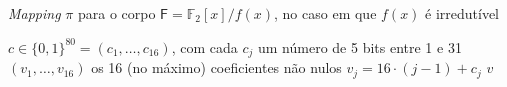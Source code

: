 \begin{algorithm}[htb!]
\caption{\textit{Mapping} $\pi$ para o corpo $\mathsf{F} = \mathbb{F}_2[x]/f(x)$, no caso em que $f(x)$ é irredutível}\label{alg:pi_irreduc}
  \begin{algorithmic}
    \Require $c \in \{0, 1\}^{80} = (c_1, \dotsc, c_{16})$, com cada $c_j$ um número de 5 bits entre 1 e 31
    \Ensure $(v_1, \dotsc, v_{16})$ os 16 (no máximo) coeficientes não nulos
    \State    $v_j = 16 \cdot (j - 1) + c_j$
    \EndFor
    \State \Return $v$
  \end{algorithmic}
\end{algorithm}
